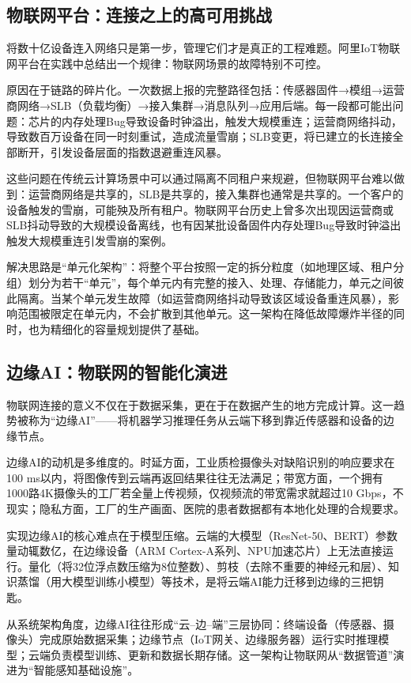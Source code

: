 \subsection{物联网平台：连接之上的高可用挑战}

将数十亿设备连入网络只是第一步，管理它们才是真正的工程难题。阿里IoT物联网平台在实践中总结出一个规律：物联网场景的故障特别不可控。

原因在于链路的碎片化。一次数据上报的完整路径包括：传感器固件→模组→运营商网络→SLB（负载均衡）→接入集群→消息队列→应用后端。每一段都可能出问题：芯片的内存处理Bug导致设备时钟溢出，触发大规模重连；运营商网络抖动，导致数百万设备在同一时刻重试，造成流量雪崩；SLB变更，将已建立的长连接全部断开，引发设备层面的指数退避重连风暴。

这些问题在传统云计算场景中可以通过隔离不同租户来规避，但物联网平台难以做到：运营商网络是共享的，SLB是共享的，接入集群也通常是共享的。一个客户的设备触发的雪崩，可能殃及所有租户。物联网平台历史上曾多次出现因运营商或SLB抖动导致的大规模设备离线，也有因某批设备固件内存处理Bug导致时钟溢出触发大规模重连引发雪崩的案例。

解决思路是``单元化架构''：将整个平台按照一定的拆分粒度（如地理区域、租户分组）划分为若干``单元''，每个单元内有完整的接入、处理、存储能力，单元之间彼此隔离。当某个单元发生故障（如运营商网络抖动导致该区域设备重连风暴），影响范围被限定在单元内，不会扩散到其他单元。这一架构在降低故障爆炸半径的同时，也为精细化的容量规划提供了基础。

\subsection{边缘AI：物联网的智能化演进}

物联网连接的意义不仅在于数据采集，更在于在数据产生的地方完成计算。这一趋势被称为``边缘AI''——将机器学习推理任务从云端下移到靠近传感器和设备的边缘节点。

边缘AI的动机是多维度的。时延方面，工业质检摄像头对缺陷识别的响应要求在100 ms以内，将图像传到云端再返回结果往往无法满足；带宽方面，一个拥有1000路4K摄像头的工厂若全量上传视频，仅视频流的带宽需求就超过10 Gbps，不现实；隐私方面，工厂的生产画面、医院的患者数据都有本地化处理的合规要求。

实现边缘AI的核心难点在于模型压缩。云端的大模型（ResNet-50、BERT）参数量动辄数亿，在边缘设备（ARM Cortex-A系列、NPU加速芯片）上无法直接运行。量化（将32位浮点数压缩为8位整数）、剪枝（去除不重要的神经元和层）、知识蒸馏（用大模型训练小模型）等技术，是将云端AI能力迁移到边缘的三把钥匙。

从系统架构角度，边缘AI往往形成``云--边--端''三层协同：终端设备（传感器、摄像头）完成原始数据采集；边缘节点（IoT网关、边缘服务器）运行实时推理模型；云端负责模型训练、更新和数据长期存储。这一架构让物联网从``数据管道''演进为``智能感知基础设施''。

